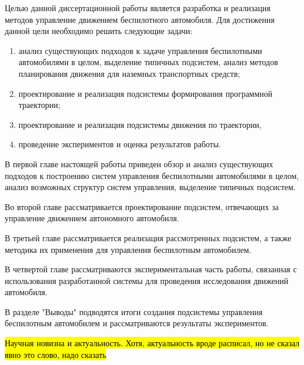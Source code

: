 Целью данной диссертационной работы является разработка и реализация методов управление движением беспилотного
автомобиля. Для достижения данной цели необходимо решить следующие задачи:

\begin{enumerate}
    \item анализ существующих подходов к задаче управления беспилотными автомобилями в целом, выделение
          типичных подсистем, анализ методов планирования движения для наземных транспортных средств;
    \item проектирование и реализация подсистемы формирования программной траектории;
    \item проектирование и реализация подсистемы движения по траектории,
    \item проведение экспериментов и оценка результатов работы.
\end{enumerate}

В первой главе настоящей работы приведен обзор и анализ существующих подходов к построению систем управления
беспилотными автомобилями в целом, анализ возможных структур систем управления, выделение типичных подсистем.

Во второй главе рассматривается проектирование подсистем, отвечающих за управление движением автономного
автомобиля.

В третьей главе рассматривается реализация рассмотренных подсистем, а также методика их применения для управления
беспилотным автомобилем.

В четвертой главе рассматриваются экспериментальная часть работы, связанная с использования разработанной системы
для проведения исследования движений автомобиля.

В разделе "Выводы" подводятся итоги создания подсистемы управления беспилотным автомобилем и рассматриваются
результаты экспериментов.

\hl{Научная новизна и актуальность. Хотя, актуальность вроде расписал, но не сказал явно это слово, надо сказать}
